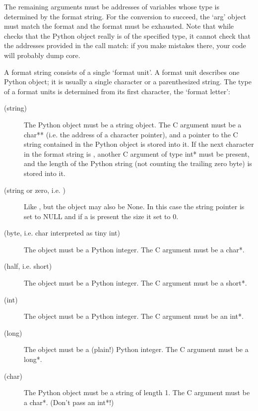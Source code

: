 The remaining arguments must be addresses of variables whose type is
determined by the format string.  For the conversion to succeed, the
`arg' object must match the format and the format must be exhausted.
Note that while  checks that the Python object really
is of the specified type, it cannot check that the addresses provided
in the call match: if you make mistakes there, your code will probably
dump core.

A format string consists of a single `format unit'.  A format unit
describes one Python object; it is usually a single character or a
parenthesized string.  The type of a format units is determined from
its first character, the `format letter':

\begin{description}

\item[ (string)]
The Python object must be a string object.  The C argument must be a
char** (i.e. the address of a character pointer), and a pointer to
the C string contained in the Python object is stored into it. If the
next character in the format string is \samp{\#}, another C argument
of type int* must be present, and the length of the Python string (not
counting the trailing zero byte) is stored into it.

\item[ (string or zero, i.e. )]
Like , but the object may also be None.  In this case the
string pointer is set to NULL and if a \samp{\#} is present the size
it set to 0.

\item[ (byte, i.e. char interpreted as tiny int)]
The object must be a Python integer.  The C argument must be a char*.

\item[ (half, i.e. short)]
The object must be a Python integer.  The C argument must be a short*.

\item[ (int)]
The object must be a Python integer.  The C argument must be an int*.

\item[ (long)]
The object must be a (plain!) Python integer.  The C argument must be
a long*.

\item[ (char)]
The Python object must be a string of length 1.  The C argument must
be a char*.  (Don't pass an int*!)


\end{description}
